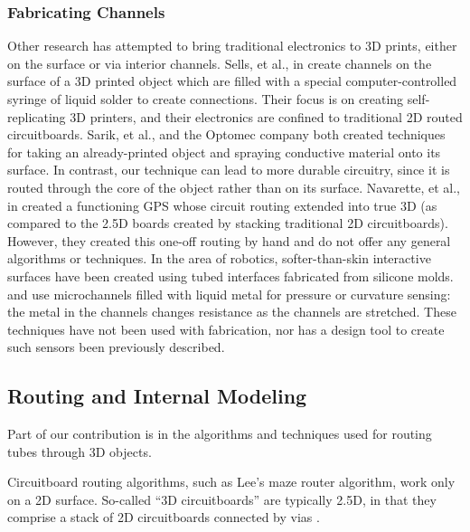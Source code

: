 \subsubsection{Fabricating Channels}

Other research has attempted to bring traditional electronics to 3D prints, either on the surface or via interior channels.  Sells, et al., in \cite{Sells-reprap} create channels on the surface of a 3D printed object which are filled with a special computer-controlled syringe of liquid solder to create connections.  Their focus is on creating self-replicating 3D printers, and their electronics are confined to traditional 2D routed circuitboards.  Sarik, et al., \cite{Sarik-tracebrush}  and the Optomec company \cite{optomec} both created techniques for taking an already-printed object and spraying conductive material onto its surface.  In contrast, our technique can lead to more durable circuitry, since it is routed through the core of the object rather than on its surface.  Navarette, et al., in \cite{Navarrette-gps} created a functioning GPS whose circuit routing extended into true 3D (as compared to the 2.5D boards created by stacking traditional 2D circuitboards).  However, they created this one-off routing by hand and do not offer any general algorithms or techniques.  In the area of robotics, softer-than-skin interactive surfaces have been created using tubed interfaces fabricated from silicone molds.  \cite{Park-microchannels} and \cite{Majidi-curvature} use microchannels filled with liquid metal for pressure or curvature sensing: the metal in the channels changes resistance as the channels are stretched.  These techniques have not been used with fabrication, nor has a design tool to create such sensors been previously described.

\subsection{Routing and Internal Modeling}

Part of our contribution is in the algorithms and techniques used for routing tubes through 3D objects.

Circuitboard routing algorithms, such as Lee's maze router algorithm, work only on a 2D surface.  So-called ``3D circuitboards'' are typically 2.5D, in that they comprise a stack of 2D circuitboards connected by vias .

